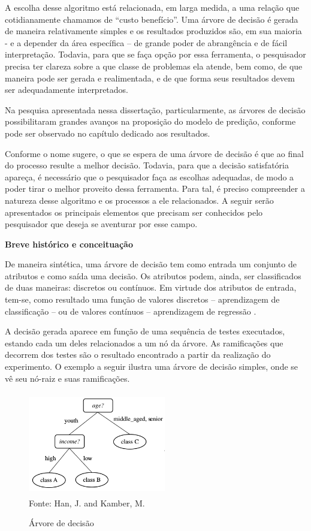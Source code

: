 A escolha desse algoritmo está relacionada, em larga medida, a uma relação que cotidianamente chamamos de “custo benefício”. Uma árvore de decisão é gerada de maneira relativamente simples e os resultados produzidos são, em sua maioria - e a depender da área específica – de grande poder de abrangência e de fácil interpretação. Todavia, para que se faça opção por essa ferramenta, o pesquisador precisa ter clareza sobre a que classe de problemas ela atende, bem como, de que maneira pode ser gerada e realimentada, e de que forma seus resultados devem ser adequadamente interpretados.

Na pesquisa apresentada nessa dissertação, particularmente, as árvores de decisão possibilitaram grandes avanços na proposição do modelo de predição, conforme pode ser observado no capítulo dedicado aos resultados. 

Conforme o nome sugere, o que se espera de uma árvore de decisão é que ao final do processo resulte a melhor decisão. Todavia, para que a decisão satisfatória apareça, é necessário que o pesquisador faça as escolhas adequadas, de modo a poder tirar o melhor proveito dessa ferramenta. Para tal, é preciso compreender a natureza desse algoritmo e os processos a ele relacionados. A seguir serão apresentados os principais elementos que precisam ser conhecidos pelo pesquisador que deseja se aventurar por esse campo.

\textbf{Breve histórico e conceituação}

De maneira sintética, uma árvore de decisão tem como entrada um conjunto de atributos e como saída uma decisão. Os atributos podem, ainda, ser classificados de duas maneiras: discretos ou contínuos. Em virtude dos atributos de entrada, tem-se, como resultado uma função de valores discretos – aprendizagem de classificação – ou de valores contínuos – aprendizagem de regressão \cite{NorvigRussel2004}.

A decisão gerada aparece em função de uma sequência de testes executados, estando cada um deles relacionados a um nó da árvore. As ramificações que decorrem dos testes são o resultado encontrado a partir da realização do experimento. 
O exemplo a seguir ilustra uma árvore de decisão simples, onde se vê seu nó-raiz e suas ramificações. 

\begin{figure}[!ht]
	\centering
	\caption{Árvore de decisão}
	\includegraphics[width=60mm, height=45mm]{Figuras/Arvore/arvorejovem.png}\\
	\tiny Fonte: Han, J. and Kamber, M. 
\end{figure} 


